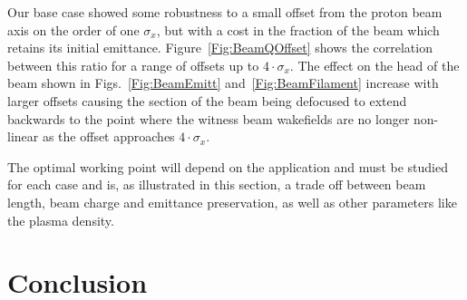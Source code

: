 \documentclass[aps,prstab,reprint,amsmath,amssymb,groupedaddress]{revtex4-1}
\newcommand{\unit}[1]{\,\mathrm{#1}}
\begin{document}
Our base case showed some robustness to a small offset from the proton beam axis on the order of one $\sigma_{x}$, but
with a cost in the fraction of the beam which retains its initial emittance. Figure~\ref{Fig:BeamQOffset} shows the
correlation between this ratio for a range of offsets up to $4\cdot\sigma_{x}$. The effect on the head of the beam shown
in Figs.~\ref{Fig:BeamEmitt} and~\ref{Fig:BeamFilament} increase with larger offsets causing the section of the beam
being defocused to extend backwards to the point where the witness beam wakefields are no longer non-linear as the
offset approaches $4\cdot\sigma_{x}$.

The optimal working point will depend on the application and must be studied for each case and is, as illustrated in
this section, a trade off between beam length, beam charge and emittance preservation, as well as other parameters
like the plasma density.   

\section{Conclusion}\label{S:C}


\end{document}
